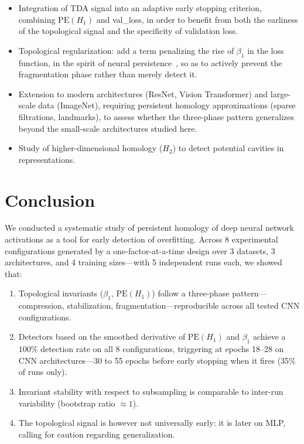 \documentclass[11pt,a4paper]{article}
\newcommand{\betti}{\beta}
\newcommand{\PE}{\mathrm{PE}}
\begin{document}
\begin{itemize}
  \item Integration of TDA signal into an adaptive early stopping criterion,
  combining $\PE(H_1)$ and val\_loss, in order to benefit from both the
  earliness of the topological signal and the specificity of validation loss.
  \item Topological regularization: add a term penalizing the rise of
  $\betti_1$ in the loss function, in the spirit of neural
  persistence~\cite{rieck2019neural}, so as to actively prevent the
  fragmentation phase rather than merely detect it.
  \item Extension to modern architectures (ResNet, Vision Transformer) and
  large-scale data (ImageNet), requiring persistent homology approximations
  (sparse filtrations, landmarks), to assess whether the three-phase pattern
  generalizes beyond the small-scale architectures studied here.
  \item Study of higher-dimensional homology ($H_2$) to detect potential
  cavities in representations.
\end{itemize}

\section{Conclusion}
\label{sec:conclusion}

We conducted a systematic study of persistent homology of deep neural network
activations as a tool for early detection of overfitting. Across 8 experimental
configurations generated by a one-factor-at-a-time design over 3 datasets, 3 architectures, and 4 training sizes---with 5 independent runs each, we showed that:

\begin{enumerate}
  \item Topological invariants ($\betti_1$, $\PE(H_1)$) follow a three-phase
  pattern---compression, stabilization, fragmentation---reproducible across
  all tested CNN configurations.

  \item Detectors based on the smoothed derivative of $\PE(H_1)$ and $\betti_1$
  achieve a $100\%$ detection rate on all 8 configurations, triggering at
  epochs 18--28 on CNN architectures---30 to 55 epochs before early stopping
  when it fires (35\% of runs only).

  \item Invariant stability with respect to subsampling is comparable to
  inter-run variability (bootstrap ratio $\approx 1$).

  \item The topological signal is however not universally early: it is later
  on MLP, calling for caution regarding generalization.
\end{enumerate}
\end{document}
